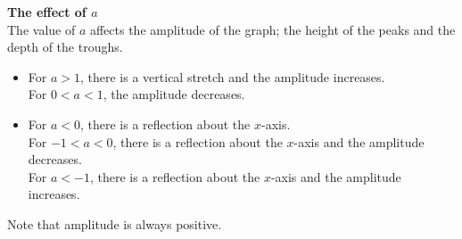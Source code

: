 \textbf{The effect of $a$}
\\
The value of $a$ affects the amplitude of the graph; the height of the
peaks and the depth of the troughs.
\begin{itemize}
 \item For $a>1$, there is a vertical stretch and the amplitude increases.\\
For $0<a<1$, the amplitude decreases.
\item For $a<0$, there is a reflection about the $x$-axis.\\ 
For $-1<a<0$, there is a reflection about the $x$-axis and the amplitude decreases.\\
For $a<-1$, there is a reflection about the $x$-axis and the amplitude increases.
\end{itemize}

Note that amplitude is always positive.\\








